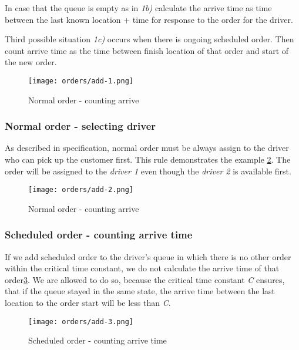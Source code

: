 	In case that the queue is empty as in \textit{1b)} calculate the arrive time as time between the last known location + time for response to the order for the driver.
	
	Third possible situation \textit{1c)} occurs when there is ongoing scheduled order. Then count arrive time as the time between finish location of that order and start of the new order.
	
	
		\begin{figure}[h]\centering
			\texttt{[image: orders/add-1.png]}
			\caption{Normal order - counting arrive} 
			\label{order-process-normal-order-counting-arrive}
		\end{figure} 
	
	\subsubsection{Normal order - selecting driver}
	
		As described in specification, normal order must be always assign to the driver who can pick up the customer first. This rule demonstrates the example  \ref{order-process-normal-order-selecting-driver}. The order will be assigned to the \textit{driver 1} even though the \textit{driver 2} is available first.
			
			\begin{figure}[h]\centering
				\texttt{[image: orders/add-2.png]}
				\caption{Normal order - counting arrive} 
				\label{order-process-normal-order-selecting-driver}
			\end{figure} 
		
	\subsubsection{Scheduled order - counting arrive time}
		If we add scheduled order to the driver's queue in which there is no other order within the critical time constant, we do not calculate the arrive time of that order\ref{order-process-scheduled-order-counting-arrive-time}. We are allowed to do so, because the critical time constant \textit{C} ensures, that if the queue stayed in the same state, the arrive time between the last location to the order start will be less than \textit{C}.
		
		\begin{figure}[h]\centering
			\texttt{[image: orders/add-3.png]}
			\caption{Scheduled order - counting arrive time} 
			\label{order-process-scheduled-order-counting-arrive-time}
		\end{figure} 
	
